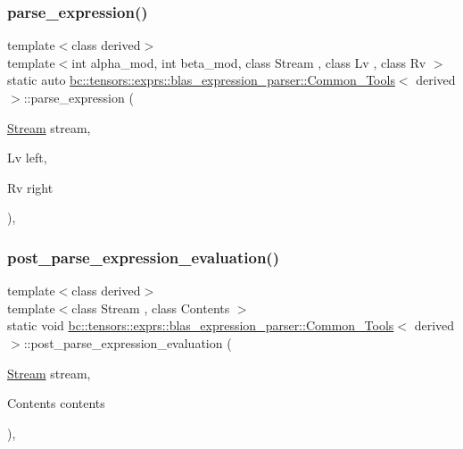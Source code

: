 \subsubsection{\texorpdfstring{parse\+\_\+expression()}{parse\_expression()}}
{\footnotesize\ttfamily template$<$class derived$>$ \\
template$<$int alpha\+\_\+mod, int beta\+\_\+mod, class Stream , class Lv , class Rv $>$ \\
static auto \hyperlink{structbc_1_1tensors_1_1exprs_1_1blas__expression__parser_1_1Common__Tools}{bc\+::tensors\+::exprs\+::blas\+\_\+expression\+\_\+parser\+::\+Common\+\_\+\+Tools}$<$ derived $>$\+::parse\+\_\+expression (\begin{DoxyParamCaption}\item[{\hyperlink{classbc_1_1streams_1_1Stream}{Stream}}]{stream,  }\item[{Lv}]{left,  }\item[{Rv}]{right }\end{DoxyParamCaption})\hspace{0.3cm}{\ttfamily [inline]}, {\ttfamily [static]}}

\mbox{\label{structbc_1_1tensors_1_1exprs_1_1blas__expression__parser_1_1Common__Tools_a1656ea49b54cbd6eae7f418093c7892a}} 
\subsubsection{\texorpdfstring{post\+\_\+parse\+\_\+expression\+\_\+evaluation()}{post\_parse\_expression\_evaluation()}}
{\footnotesize\ttfamily template$<$class derived$>$ \\
template$<$class Stream , class Contents $>$ \\
static void \hyperlink{structbc_1_1tensors_1_1exprs_1_1blas__expression__parser_1_1Common__Tools}{bc\+::tensors\+::exprs\+::blas\+\_\+expression\+\_\+parser\+::\+Common\+\_\+\+Tools}$<$ derived $>$\+::post\+\_\+parse\+\_\+expression\+\_\+evaluation (\begin{DoxyParamCaption}\item[{\hyperlink{classbc_1_1streams_1_1Stream}{Stream}}]{stream,  }\item[{Contents}]{contents }\end{DoxyParamCaption})\hspace{0.3cm}{\ttfamily [inline]}, {\ttfamily [static]}}



